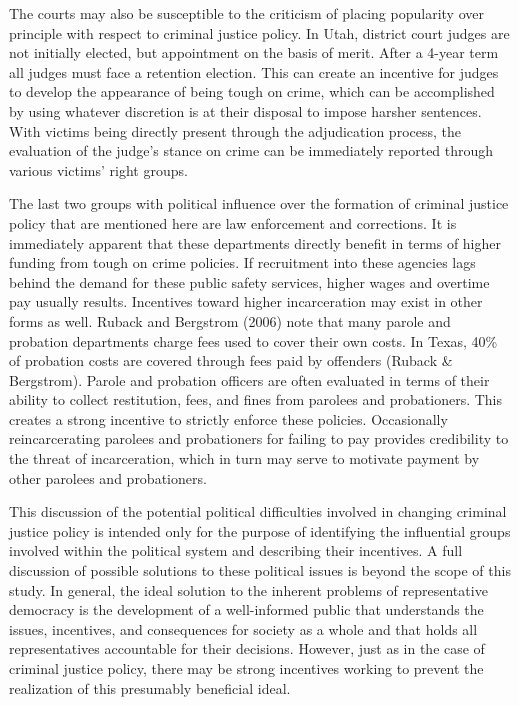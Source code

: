 The courts may also be susceptible to the criticism of placing popularity over principle with respect to criminal justice policy.  In Utah, district court judges are not initially elected, but appointment on the basis of merit.  After a 4-year term all judges must face a retention election.  This can create an incentive for judges to develop the appearance of being tough on crime, which can be accomplished by using whatever discretion is at their disposal to impose harsher sentences.  With victims being directly present through the adjudication process, the evaluation of the judge's stance on crime can be immediately reported through various victims' right groups.

The last two groups with political influence over the formation of criminal justice policy that are mentioned here are law enforcement and corrections.  It is immediately apparent that these departments directly benefit in terms of higher funding from tough on crime policies.  If recruitment into these agencies lags behind the demand for these public safety services, higher wages and overtime pay usually results.  Incentives toward higher incarceration may exist in other forms as well.  Ruback and Bergstrom (2006) note that many parole and probation departments charge fees used to cover their own costs.  In Texas, 40\% of probation costs are covered through fees paid by offenders (Ruback \& Bergstrom).  Parole and probation officers are often evaluated in terms of their ability to collect restitution, fees, and fines from parolees and probationers.  This creates a strong incentive to strictly enforce these policies.  Occasionally reincarcerating parolees and probationers for failing to pay provides credibility to the threat of incarceration, which in turn may serve to motivate payment by other parolees and probationers.

This discussion of the potential political difficulties involved in changing criminal justice policy is intended only for the purpose of identifying the influential groups involved within the political system and describing their incentives.  A full discussion of possible solutions to these political issues is beyond the scope of this study.
In general, the ideal solution to the inherent problems of representative democracy is the development of a well-informed public that understands the issues, incentives, and consequences for society as a whole and that holds all representatives accountable for their decisions.  However, just as in the case of criminal justice policy, there may be strong incentives working to prevent the realization of this presumably beneficial ideal.

